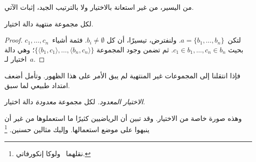 \documentclass[../../../include/open-logic-section]{subfiles}
\begin{document}

من اليسير، من غير استعانة بالاختيار ولا بالترتيب الجيد، إثبات الآتي.

\begin{lem}[في $\Zminus$]
لكل مجموعة منتهية دالة اختيار.
\end{lem}

\begin{proof}
لتكن~$a = \{b_1, \ldots, b_n\}$. ولنفترض، تيسيرًا، أن كل
$b_i \neq \emptyset$. فثمة أشياء~$c_1, \ldots, c_n$ بحيث
$c_1 \in b_1, \ldots, c_n \in b_n$. ثم تضمن
 وجود المجموعة
$\{\langle b_1, c_1\rangle , \ldots, \langle b_n, c_n\rangle\}$؛
وهي دالة اختيار لـ~$a$.
\end{proof}

فإذا انتقلنا إلى المجموعات غير المنتهية لم يبق الأمر على هذا الظهور.
وتأمل أضعف امتداد طبيعي لما سبق.

\begin{defish}
\emph{الاختيار المعدود.} لكل مجموعة \emph{معدودة} دالة اختيار.
\end{defish}

وهذه صورة خاصة من الاختيار. وقد تبين أن الرياضيين كثيرًا ما استعملوها
من غير أن ينبهوا على موضع استعمالها. وإليك مثالين حسنين.
\footnote{نقلهما~\citet[\S9.4]{Potter2004} ولوكا إنكورفاتي.}
\end{document}
